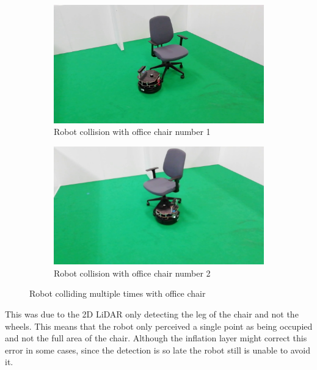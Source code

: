 \begin{figure}[h!]
  \centering
  \begin{subfigure}[b]{0.49\linewidth}
    \includegraphics[width=\linewidth]{imgs/chapter5/wchairLF.png}
     \caption{Robot collision with office chair number 1}
     \label{fig::wchair}
  \end{subfigure}
  \begin{subfigure}[b]{0.49\linewidth}
    \includegraphics[width=\linewidth]{imgs/chapter5/wchairLF2.png}
    \caption{Robot collision with office chair number 2}
    \label{fig::nchair}
  \end{subfigure}
  \caption{Robot colliding multiple times with office chair}
  \label{fig:wchairLF}
\end{figure}






This was due to the 2D \ac{LiDAR} only detecting the leg of the chair and not the wheels. This means that the robot only perceived a single point as being occupied and not the full area of the chair. Although the inflation layer  might correct this error in some cases, since the detection is so late the robot still is unable to avoid it.

